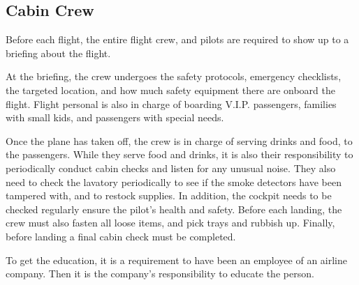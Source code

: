 \subsection{Cabin Crew}
Before each flight, the entire flight crew, and pilots are required to show up to a briefing about the flight.

At the briefing, the crew undergoes the safety protocols, emergency checklists, the targeted location, and how much safety equipment there are onboard the flight. Flight personal is also in charge of boarding V.I.P. passengers, families with small kids, and passengers with special needs.

Once the plane has taken off, the crew is in charge of serving drinks and food, to the passengers. While they serve food and drinks, it is also their responsibility to periodically conduct cabin checks and listen for any unusual noise. They also need to check the lavatory periodically to see if the smoke detectors have been tampered with, and to restock supplies. In addition, the cockpit needs to be checked regularly ensure the pilot's health and safety. Before each landing, the crew must also fasten all loose items, and pick trays and rubbish up. Finally, before landing a final cabin check must be completed.

To get the education, it is a requirement to have been an employee of an airline company. Then it is the company’s responsibility to educate the person. 

